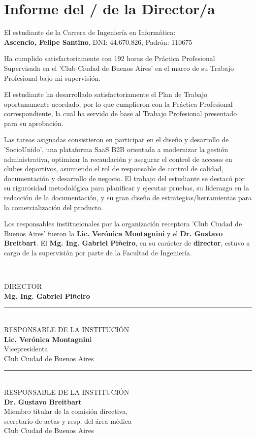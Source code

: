 \section{Informe del / de la Director/a}

El estudiante de la Carrera de Ingeniería en Informática: \\ 
\textbf{Ascencio, Felipe Santino}, DNI: 44.670.826, Padrón: 110675

Ha cumplido satisfactoriamente con 192 horas de Práctica Profesional Supervisada en el 'Club Ciudad de Buenos Aires' en el marco de su Trabajo Profesional bajo mi supervisión.

El estudiante ha desarrollado satisfactoriamente el Plan de Trabajo oportunamente acordado, por lo que cumplieron con la Práctica Profesional correspondiente, la cual ha servido de base al Trabajo Profesional presentado para su aprobación.

Las tareas asignadas consistieron en participar en el diseño y desarrollo de 'SocioUnido', una plataforma SaaS B2B orientada a modernizar la gestión administrativa, optimizar la recaudación y asegurar el control de accesos en clubes deportivos, asumiendo el rol de responsable de control de calidad, documentación y desarrollo de negocio. El trabajo del estudiante se destacó por su rigurosidad metodológica para planificar y ejecutar pruebas, su liderazgo en la redacción de la documentación, y su gran diseño de estrategias/herramientas para la comercialización del producto.

Los responsables institucionales por la organización receptora 'Club Ciudad de Buenos Aires' fueron la \textbf{Lic. Verónica Montagnini} y el \textbf{Dr. Gustavo Breitbart}. El \textbf{Mg. Ing. Gabriel Piñeiro}, en su carácter de \textbf{director}, estuvo a cargo de la supervisión por parte de la Facultad de Ingeniería.

\vspace{1.5cm}
\noindent\rule{8cm}{0.4pt} \\
DIRECTOR \\
\textbf{Mg. Ing. Gabriel Piñeiro}

\vspace{1.5cm}
\noindent
\begin{minipage}[t]{0.45\textwidth}
    \centering
    \rule{\linewidth}{0.4pt} \\
    RESPONSABLE DE LA INSTITUCIÓN \\
    \textbf{Lic. Verónica Montagnini} \\
    Vicepresidenta \\
    Club Ciudad de Buenos Aires
\end{minipage}
\hfill
\begin{minipage}[t]{0.45\textwidth}
    \centering
    \rule{\linewidth}{0.4pt} \\
    RESPONSABLE DE LA INSTITUCIÓN \\
    \textbf{Dr. Gustavo Breitbart} \\
    Miembro titular de la comisión directiva, \\
    secretario de actas y resp. del área médica \\
    Club Ciudad de Buenos Aires
\end{minipage}

